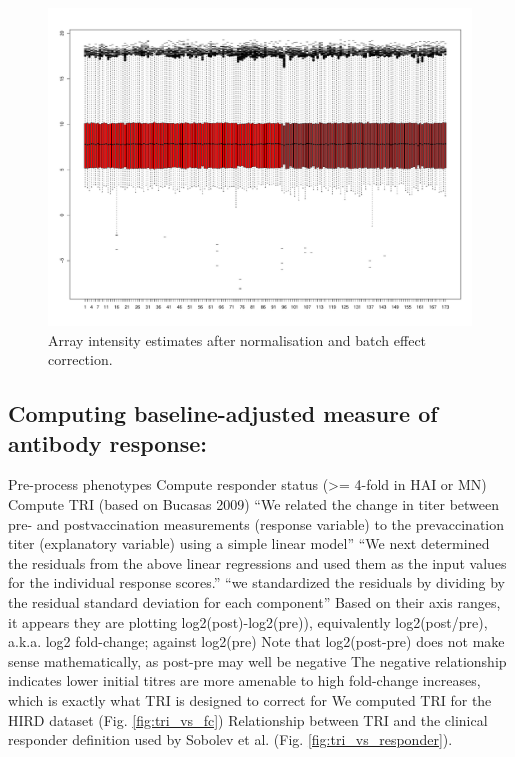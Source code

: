 \begin{outline}
\begin{figure}
    \includegraphics[width=1.0\textwidth]{./mainmatter/figures/chapter_02/array_data_setup.array_intensity_boxplots.MaxMean.combat.pdf}
    \caption{Array intensity estimates after normalisation and batch effect correction.}
\end{figure}

\end{outline}

\subsection{Computing baseline-adjusted measure of antibody response: }

\begin{outline}
\1 Pre-process phenotypes
    \2 Compute responder status (>= 4-fold in HAI or MN)
    \2 Compute TRI (based on Bucasas 2009)
        \3 “We related the change in titer between pre- and postvaccination measurements (response variable) to the prevaccination titer (explanatory variable) using a simple linear model”
        \3 “We next determined the residuals from the above linear regressions and used them as the input values for the individual response scores.”
        \3 “we standardized the residuals by dividing by the residual standard deviation for each component”
            \4 Based on their axis ranges, it appears they are plotting log2(post)-log2(pre)), equivalently log2(post/pre), a.k.a. log2 fold-change; against log2(pre)
            \4 Note that log2(post-pre) does not make sense mathematically, as post-pre may well be negative
            \4 The negative relationship indicates lower initial titres are more amenable to high fold-change increases, which is exactly what TRI is designed to correct for
\1 We computed TRI for the HIRD dataset (Fig. \ref{fig:tri_vs_fc})
\1 Relationship between TRI and the clinical responder definition used by Sobolev et al. (Fig. \ref{fig:tri_vs_responder}).
\end{outline}

